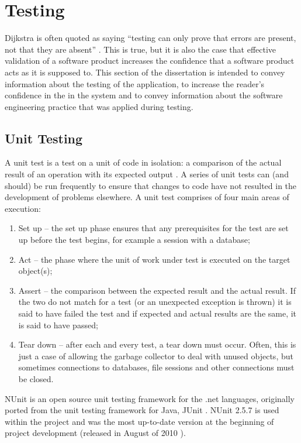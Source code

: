 \chapter{Testing}
\label{testing}
Dijkstra is often quoted as saying ``testing can only prove that errors are present, not that they are absent'' \cite{dijkstra}. This is true, but it is also the case that effective validation of a software product increases the confidence that a software product acts as it is supposed to.  This section of the dissertation is intended to convey information about the testing of the application, to increase the reader's confidence in the in the system and to convey information about the software engineering practice that was applied during testing.

\section{Unit Testing}
A unit test is a test on a unit of code in isolation: a comparison of the actual result of an operation with its expected output \cite{unitTesting}.  A series of unit tests can (and should) be run frequently to ensure that changes to code have not resulted in the development of problems elsewhere.  A unit test comprises of four main areas of execution:
\begin{enumerate}
	\item Set up -- the set up phase ensures that any prerequisites for the test are set up before the test begins, for example a session with a database;
	\item Act -- the phase where the unit of work under test is executed on the target object(s);
	\item Assert -- the comparison between the expected result and the actual result.  If the two do not match for a test (or an unexpected exception is thrown) it is said to have failed the test and if expected and actual results are the same, it is said to have passed;
	\item Tear down -- after each and every test, a tear down must occur.  Often, this is just a case of allowing the garbage collector to deal with unused objects, but sometimes connections to databases, file sessions and other connections must be closed.
\end{enumerate}

NUnit is an open source unit testing framework for the .\gls{net} languages, originally ported from the unit testing framework for Java, JUnit \cite{nUnitHome}.  NUnit 2.5.7 is used within the project and was the most up-to-date version at the beginning of project development (released in August of 2010 \cite{nUnitRelease}).  

